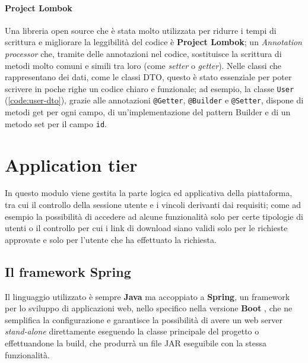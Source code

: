 \paragraph{Project Lombok}
Una libreria open source che è stata molto utilizzata per ridurre i tempi di
scrittura e migliorare la leggibilità del codice è \textbf{Project Lombok};
un \textit{Annotation processor} che, tramite delle annotazioni nel codice,
sostituisce la scrittura di metodi molto comuni e simili tra loro (come
\textit{setter} o \textit{getter}).
Nelle classi che rappresentano dei dati, come le classi DTO, questo è stato
essenziale per poter scrivere in poche righe un codice chiaro e funzionale;
ad esempio, la classe \texttt{User} (\ref{code:user-dto}), grazie alle annotazioni
\texttt{@Getter}, \texttt{@Builder} e \texttt{@Setter}, dispone di metodi get
per ogni campo, di un'implementazione del pattern Builder e di un metodo set per
il campo \texttt{id}.





\section{Application tier}
In questo modulo viene gestita la parte logica ed applicativa della piattaforma,
tra cui il controllo della sessione utente e i vincoli derivanti dai requisiti;
come ad esempio la possibilità di accedere ad alcune funzionalità solo per certe
tipologie di utenti o il controllo per cui i link di download siano validi solo
per le richieste approvate e solo per l'utente che ha effettuato la richiesta. 


\subsection{Il framework Spring}
Il linguaggio utilizzato è sempre \textbf{Java} ma accoppiato a \textbf{Spring},
un framework per lo sviluppo di applicazioni web, nello specifico nella versione
\textbf{Boot} \cite{spring:boot}, che ne semplifica la configurazione e garantisce
la possibilità di avere un web server \textit{stand-alone} direttamente eseguendo
la classe principale del progetto o effettuandone la build, che produrrà un file
JAR eseguibile con la stessa funzionalità.


